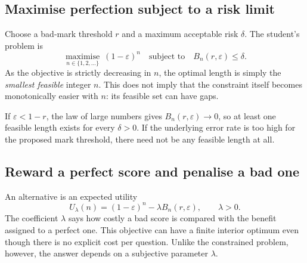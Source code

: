 \documentclass[11pt,a4paper]{article}
\begin{document}
\subsection{Maximise perfection subject to a risk limit}
Choose a bad-mark threshold $r$ and a maximum acceptable risk $\delta$. The student's problem is
\begin{equation}
 \boxed{\quad\underset{n\in\{1,2,\ldots\}}{\operatorname{maximise}}\ (1-\varepsilon)^n
 \quad\text{subject to}\quad B_n(r,\varepsilon)\leq\delta.\quad}
 \label{eq:constraint}
\end{equation}
As the objective is strictly decreasing in $n$, the optimal length is simply the \emph{smallest feasible} integer $n$. This does not imply that the constraint itself becomes monotonically easier with $n$: its feasible set can have gaps.

If $\varepsilon<1-r$, the law of large numbers gives $B_n(r,\varepsilon)\to0$, so at least one feasible length exists for every $\delta>0$. If the underlying error rate is too high for the proposed mark threshold, there need not be any feasible length at all.

\subsection{Reward a perfect score and penalise a bad one}
An alternative is an expected utility
\begin{equation}
 U_\lambda(n)=(1-\varepsilon)^n-\lambda B_n(r,\varepsilon),
 \qquad\lambda>0.
 \label{eq:utility}
\end{equation}
The coefficient $\lambda$ says how costly a bad score is compared with the benefit assigned to a perfect one. This objective can have a finite interior optimum even though there is no explicit cost per question. Unlike the constrained problem, however, the answer depends on a subjective parameter $\lambda$.
\end{document}
